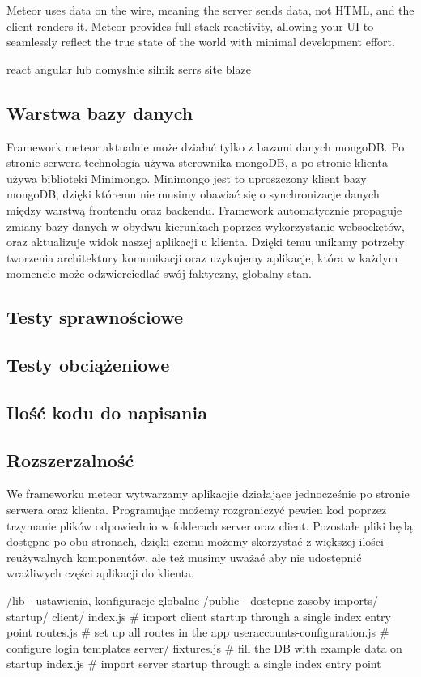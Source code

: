 \documentclass[12pt]{report}
\begin{document}
      Meteor uses data on the wire, meaning the server sends data, not HTML, and the client renders it.
      Meteor provides full stack reactivity, allowing your UI to seamlessly reflect the true state of the world with minimal development effort.

      react angular lub domyslnie silnik serrs site blaze

    \subsection{Warstwa bazy danych}
      Framework meteor aktualnie może działać tylko z bazami danych mongoDB.
      Po stronie serwera technologia używa sterownika mongoDB, a po stronie klienta używa biblioteki Minimongo.
      Minimongo jest to uproszczony klient bazy mongoDB, dzięki któremu nie musimy obawiać się o synchronizacje danych między warstwą frontendu oraz backendu.
      Framework automatycznie propaguje zmiany bazy danych w obydwu kierunkach poprzez wykorzystanie websocketów, oraz aktualizuje widok naszej aplikacji u klienta.
      Dzięki temu unikamy potrzeby tworzenia architektury komunikacji oraz uzykujemy aplikacje, która w każdym momencie może odzwierciedlać swój faktyczny, globalny stan.

    \subsection{Testy sprawnościowe}
    \subsection{Testy obciążeniowe}
    \subsection{Ilość kodu do napisania}
    \subsection{Rozszerzalność}
      We frameworku meteor wytwarzamy aplikacjie działające jednocześnie po stronie serwera oraz klienta.
      Programując możemy rozgraniczyć pewien kod poprzez trzymanie plików odpowiednio w folderach server oraz client.
      Pozostałe pliki będą dostępne po obu stronach, dzięki czemu możemy skorzystać z większej ilości reużywalnych komponentów, ale też musimy uważać aby nie udostępnić wrażliwych części aplikacji do klienta.


/lib - ustawienia, konfiguracje globalne
/public - dostepne zasoby
imports/
  startup/
    client/
      index.js                 # import client startup through a single index entry point
      routes.js                # set up all routes in the app
      useraccounts-configuration.js # configure login templates
    server/
      fixtures.js              # fill the DB with example data on startup
      index.js                 # import server startup through a single index entry point
\end{document}
